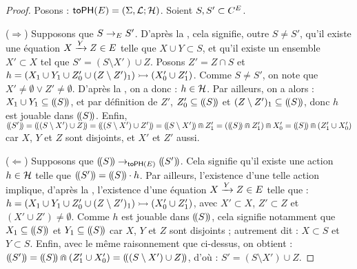 \begin{proof}
  Posons : $\mathsf{toPH}(E) = (\Sigma, \mathcal{L}; \mathcal{H})$.
  Soient $S, S' \subset C^{E}$.
  
  ($\Rightarrow$) Supposons que $S \rightarrow_{E} S'$.
    D'après la ,
    cela signifie, outre $S \neq S'$,
    qu'il existe une équation $X \xrightarrow{Y} Z \in E$
    telle que $X \cup Y \subset S$,
    et qu'il existe un ensemble $X' \subset X$ tel que $S' = (S \setminus X') \cup Z$.
    Posons $Z' = Z \cap S$
    et $h = \mbox{$(X_1 \cup Y_1 \cup Z'_0 \cup (Z \setminus Z')_1) \rightarrowtail (X'_0 \cup Z'_1)$}$.
    Comme $S \neq S'$, on note que $X' \neq \emptyset \vee Z' \neq \emptyset$.
    D'après la , on a donc : $h \in \mathcal{H}$.
    Par ailleurs, on a alors : $X_1 \cup Y_1 \subseteq (\!(S)\!)$,
    et par définition de $Z'$, $Z'_0 \subseteq (\!(S)\!)$
    et $(Z \setminus Z')_1 \subseteq (\!(S)\!)$,
    donc $h$ est jouable dans $(\!(S)\!)$.
    Enfin, $\tophm{S'} = \tophm{(S \setminus X') \cup Z} = \tophm{(S \setminus X') \cup Z'} =
      \tophm{S \setminus X'} \recouvre Z'_1 = (\tophm{S} \recouvre Z'_1) \recouvre X'_0 =
      \tophm{S} \recouvre (Z'_1 \cup X'_0)$
    car $X$, $Y$ et $Z$ sont disjoints, et $X'$ et $Z'$ aussi.
  
  ($\Leftarrow$) Supposons que $(\!(S)\!) \rightarrow_{\mathsf{toPH}(E)} (\!(S')\!)$.
    Cela signifie qu'il existe une action $h \in \mathcal{H}$
    telle que $(\!(S')\!) = (\!(S)\!) \cdot h$.
    Par ailleurs, l'existence d'une telle action implique, d'après la ,
    l'existence d'une équation $X \xrightarrow{Y} Z \in E$ telle que :
    $h = \mbox{$(X_1 \cup Y_1 \cup Z'_0 \cup (Z \setminus Z')_1) \rightarrowtail (X'_0 \cup Z'_1)$}$,
    avec $X' \subset X$, $Z' \subset Z$ et $(X' \cup Z') \neq \emptyset$.
    Comme $h$ est jouable dans $(\!(S)\!)$, cela signifie notamment que
    $X_1 \subseteq (\!(S)\!)$ et $Y_1 \subseteq (\!(S)\!)$
    car $X$, $Y$ et $Z$ sont disjoints ; %
    autrement dit : $X \subset S$ et $Y \subset S$.
    Enfin, avec le même raisonnement que ci-dessus, on obtient :
    $(\!(S')\!) = (\!(S)\!) \Cap (Z'_1 \cup X'_0) = (\!((S \setminus X') \cup Z)\!)$,
    d'où : $S' = (S \setminus X') \cup Z$.
\end{proof}

